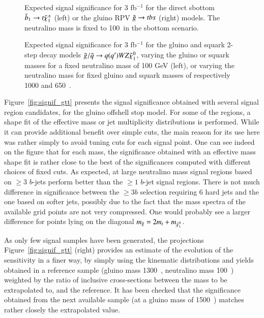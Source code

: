 \begin{figure}[htb!]
\centering
{}
\caption{Expected signal significance for 3 fb$^{-1}$ for the direct sbottom $\tilde{b}_{1}\rightarrow t\tilde{\chi}_{1}^{\pm}$ (left) 
or the gluino RPV $\tilde{g} \rightarrow tbs$ (right) models. The neutralino mass is fixed to 100~\GeV in the sbottom scenario. }
\label{fig:signif_sbottom_and_rpv}
\end{figure}

\begin{figure}[htb!]
\centering
{}
\caption{Expected signal significance for 3 fb$^{-1}$ for the gluino and squark 2-step decay models $\tilde{g} /\tilde{q}\rightarrow q(q')WZ\tilde{\chi}_{1}^{0}$, 
varying the gluino or squark masses for a fixed neutralino mass of 100 GeV (left), 
or varying the neutralino mass for fixed gluino and squark masses of respectively 1000 and 650~\GeV. 
}
\label{fig:signif_firstgen}
\end{figure}

Figure~\ref{fig:signif_gtt} presents the signal significance obtained with several signal region candidates, for the gluino offshell stop model. 
For some of the regions, a shape fit of the effective mass or jet multiplicity distributions is performed. 
While it can provide additional benefit over simple cuts, the main reason for its use here was rather simply to avoid tuning cuts for each signal point. 
One can see indeed on the figure that for each mass, the significance obtained with an effective mass shape fit is rather close to the best 
of the significances computed with different choices of fixed cuts. 
As expected, at large neutralino mass signal regions based on $\geq 3$ $b$-jets perform better than the $\geq 1$ $b$-jet signal regions. 
There is not much difference in significance between the $\geq 3b$ selection requiring 6 hard jets and the one based on softer jets, 
possibly due to the fact that the mass spectra of the available grid points are not very compressed. 
One would probably see a larger difference for points lying on the diagonal $m_{\tilde{g} }=2m_t+m_{\tilde{\chi}_{1}^{0}}$.

As only few signal samples have been generated, the projections 
Figure~\ref{fig:signif_gtt} (right) provides an estimate of the evolution of the sensitivity in a finer way, 
by simply using the kinematic distributions and yields obtained in a reference sample (gluino mass 1300~\GeV, neutralino mass 100~\GeV) 
weighted by the ratio of inclusive cross-sections between the mass to be extrapolated to, and the reference.  
It has been checked that the significance obtained from the next available sample (at a gluino mass of 1500~\GeV) matches rather closely the extrapolated value. 

